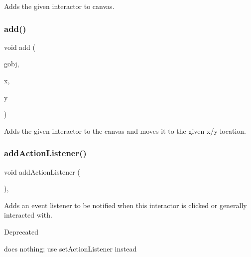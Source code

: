 Adds the given interactor to canvas. 

\mbox{\label{classsgl_1_1GCanvas_a5b11b532869632a6c26b098b0858eac5}} 
\subsubsection{\texorpdfstring{add()}{add()}\hspace{0.1cm}{\footnotesize\ttfamily [4/4]}}
{\footnotesize\ttfamily void add (\begin{DoxyParamCaption}\item[{\mbox{\hyperlink{classsgl_1_1GObject}{G\+Object}} \&}]{gobj,  }\item[{double}]{x,  }\item[{double}]{y }\end{DoxyParamCaption})\hspace{0.3cm}{\ttfamily [virtual]}}



Adds the given interactor to the canvas and moves it to the given x/y location. 

\mbox{\label{classsgl_1_1GInteractor_a02f20ea6edfa0671f31c4c648a253833}} 
\subsubsection{\texorpdfstring{add\+Action\+Listener()}{addActionListener()}}
{\footnotesize\ttfamily void add\+Action\+Listener (\begin{DoxyParamCaption}{ }\end{DoxyParamCaption})\hspace{0.3cm}{\ttfamily [virtual]}, {\ttfamily [inherited]}}



Adds an event listener to be notified when this interactor is clicked or generally interacted with. 

\begin{DoxyRefDesc}{Deprecated}
\item[\mbox{\hyperlink{deprecated__deprecated000006}{Deprecated}}]does nothing; use set\+Action\+Listener instead \end{DoxyRefDesc}
\mbox{\label{classsgl_1_1GDrawingSurface_a3a690bcb2d62250c9e4722ad7c1b9ab6}} 
